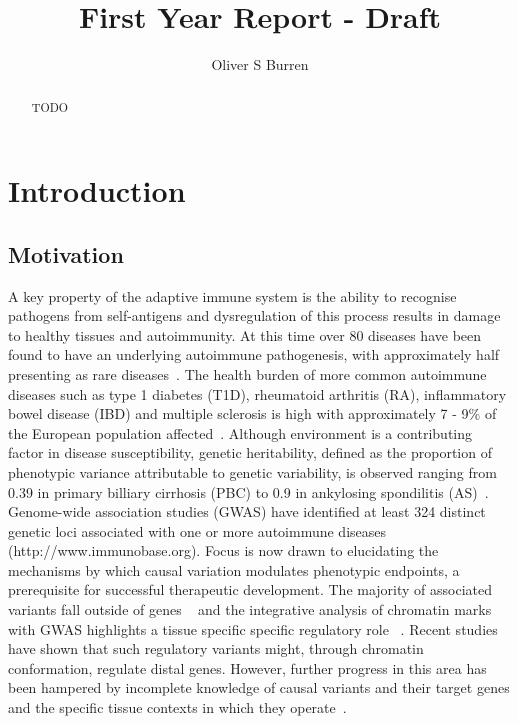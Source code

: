 \documentclass[a4paper,11pt]{report}
\author{Oliver S Burren}
\title{First Year Report - Draft}
\begin{document}
\maketitle

\begin{abstract}
   TODO
\end{abstract}
\tableofcontents
\chapter{Introduction}

\section{Motivation}

A key property of the adaptive immune system is the ability to recognise pathogens from self-antigens and dysregulation of this process results in damage to healthy tissues and autoimmunity. At this time over 80 diseases have been found to have an underlying autoimmune pathogenesis, with approximately half presenting as rare diseases~\citep{HayterCook2012}. The health burden of more common autoimmune diseases such as type 1 diabetes (T1D), rheumatoid arthritis (RA), inflammatory bowel disease (IBD) and multiple sclerosis is high with approximately 7 - 9$\%$ of the European population affected~\citep{CooperBynumSomers2009}. Although environment is a contributing factor in disease susceptibility, genetic heritability, defined as the proportion of phenotypic variance attributable to genetic variability, is observed ranging from 0.39 in primary billiary cirrhosis (PBC) to 0.9 in ankylosing spondilitis (AS)~\citep{Gutierrez-ArcelusRichRaychaudhuri2016}.  Genome-wide association studies (GWAS) have identified at least 324 distinct genetic loci associated with one or more autoimmune diseases (http://www.immunobase.org). Focus is now drawn to elucidating the mechanisms by which causal variation modulates phenotypic endpoints, a prerequisite for successful therapeutic development. The majority of associated variants fall outside of genes ~\citep{MauranoHumbertRynesEtAl2012} and the integrative analysis of chromatin marks with GWAS highlights a tissue specific specific regulatory role ~\citep{FarhMarsonZhuEtAl2015}.  Recent studies ~\citep{ClaussnitzerDankelKimEtAl2015,SmemoTenaKimEtAl2014,Davison2012-zk} have shown that such regulatory variants might, through chromatin conformation, regulate distal genes. However, further progress in this area has been hampered by incomplete knowledge of causal variants and their target genes and the specific tissue contexts in which they operate~\citep{Albert2015-jn}.
\end{document}
